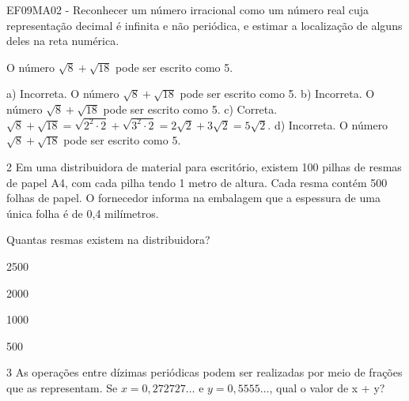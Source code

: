 {{{\begin{escolha}
{{{{\begin{escolha}
\begin{escolha}
{\begin{escolha}
\begin{escolha}
\begin{escolha}
\begin{escolha}
\begin{escolha}
\begin{escolha}
{EF09MA02 - Reconhecer um número irracional como um número real cuja
representação decimal é infinita e não periódica, e estimar a localização
de alguns deles na reta numérica. 

O número $\sqrt{8} + \sqrt{18}$ pode ser escrito como 5.

a) Incorreta. O número $\sqrt{8} + \sqrt{18}$ pode ser escrito 
como 5. 
b) Incorreta. O número $\sqrt{8} + \sqrt{18}$ pode ser escrito 
como 5. 
c) Correta. $\sqrt{8} + \sqrt{18} = \sqrt{2^{2} \cdot 2} + \sqrt{3^{2} \cdot 2} = 2\sqrt{2} + 3\sqrt{2} = 5\sqrt{2}.$
d) Incorreta. O número $\sqrt{8} + \sqrt{18}$ pode ser escrito 
como 5.} 

\num{2} Em uma distribuidora de material para escritório, existem 100 
pilhas de resmas de papel A4, com cada pilha tendo 1 metro de altura. Cada 
resma contém 500 folhas de papel. O fornecedor informa na embalagem que a 
espessura de uma única folha é de 0,4 milímetros.

Quantas resmas existem na distribuidora?

\begin{escolha}

\item 2500

\item 2000

\item 1000

\item 500

\end{escolha}


\num{3} As operações entre dízimas periódicas podem ser realizadas 
por meio de frações que as representam. Se $x = 0,272727\ldots{}$ e 
$y = 0,5555\ldots{}$, qual o valor de x + y?


\end{escolha}
\end{escolha}
\end{escolha}
\end{escolha}
\end{escolha}
\end{escolha}}
\end{escolha}
\end{escolha}}}}}
\end{escolha}}}}
